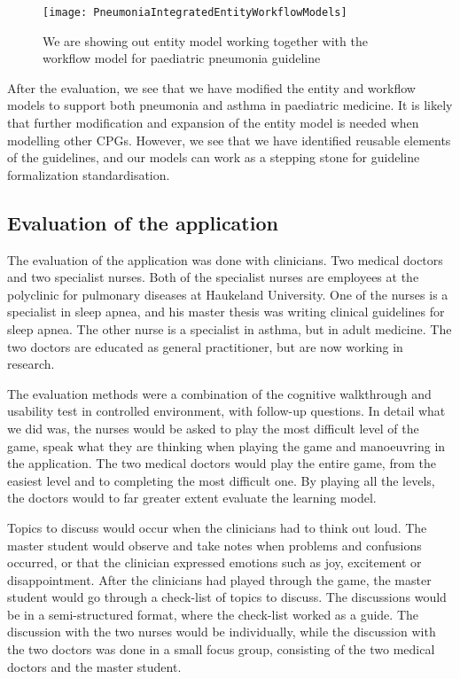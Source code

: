 \begin{figure}[h!]
	\texttt{[image: PneumoniaIntegratedEntityWorkflowModels]}
	\caption {We are showing out entity model working together with the workflow model for paediatric pneumonia guideline \parencite{RepublicofKeny2016}}	
	\label{fig:PneumoniaPneumoniaIntegratedEntityWorkflowModels}
\end{figure}

After the evaluation, we see that we have modified the entity and workflow models to support both pneumonia and asthma in paediatric medicine. It is likely that further modification and expansion of the entity model is needed when modelling other CPGs. However, we see that we have identified reusable elements of the guidelines, and our models can work as a stepping stone for guideline formalization standardisation.


\subsection{Evaluation of the application}
The evaluation of the application was done with clinicians.	Two medical doctors and two specialist nurses. Both of the specialist nurses are employees at the polyclinic for pulmonary diseases at Haukeland University. One of the nurses is a specialist in sleep apnea, and his master thesis was writing clinical guidelines for sleep apnea. The other nurse is a specialist in asthma, but in adult medicine. The two doctors are educated as general practitioner, but are now working in research.

The evaluation methods were a combination of the cognitive walkthrough and usability test in controlled environment, with follow-up questions. In detail what we did was, the nurses would be asked to play the most difficult level of the game, speak what they are thinking when playing the game and manoeuvring in the application.  The two medical doctors would play the entire game, from the easiest level and to completing the most difficult one. By playing all the levels, the doctors would to far greater extent evaluate the learning model.

Topics to discuss would occur when the clinicians had to think out loud. The master student would observe and take notes when problems and confusions occurred, or that the clinician expressed emotions such as joy, excitement or disappointment. After the clinicians had played through the game, the master student would go through a check-list of topics to discuss. The discussions would be in a semi-structured format, where the check-list worked as a guide. The discussion with the two nurses would be individually, while  the discussion with the two doctors was done in a small focus group, consisting of the two medical doctors and the master student. 


